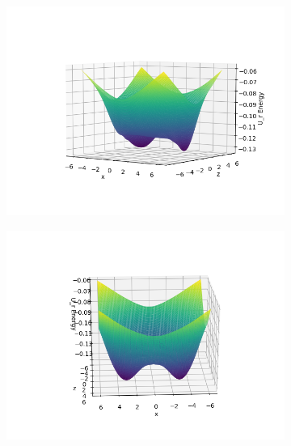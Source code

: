 \documentclass[..Thesis.tex]{subfiles}
\begin{document}
\begin{figure}[h!]
  \centering
  \begin{subfigure}[b]{0.49\linewidth}
    \includegraphics[width=\linewidth]{img/Urpot5.png}
  \end{subfigure}
  \begin{subfigure}[b]{0.49\linewidth}
    \includegraphics[width=\linewidth]{img/Urpot2.png}
  \end{subfigure}
  \begin{subfigure}[b]{0.49\linewidth}

\end{subfigure}
\end{figure}
\end{document}
